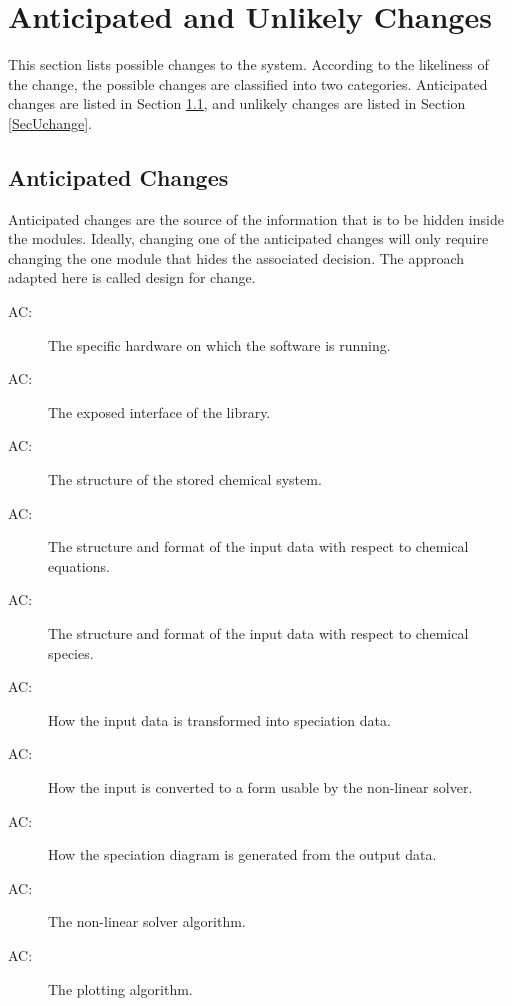 \documentclass[12pt, titlepage]{article}
\newcounter{acnum}
\newcommand{\actheacnum}{AC\theacnum}
\begin{document}
\section{Anticipated and Unlikely Changes} \label{SecChange}

This section lists possible changes to the system. According to the likeliness
of the change, the possible changes are classified into two
categories. Anticipated changes are listed in Section \ref{SecAchange}, and
unlikely changes are listed in Section \ref{SecUchange}.

\subsection{Anticipated Changes} \label{SecAchange}

Anticipated changes are the source of the information that is to be hidden
inside the modules. Ideally, changing one of the anticipated changes will only
require changing the one module that hides the associated decision. The approach
adapted here is called design for
change.

\begin{description}
\item[ \actheacnum \label{acHardware}:] The specific
  hardware on which the software is running.
\item[ \actheacnum \label{acEI}:] The exposed interface 
  of the library.  
\item[ \actheacnum \label{acI}:] The structure of the stored
  chemical system.
\item[ \actheacnum \label{acIE}:] The structure and format of the
  input data with respect to chemical equations.  
\item[ \actheacnum \label{acIS}:] The structure and format of the
  input data with respect to chemical species.
\item[ \actheacnum \label{acC}:] How the input data is 
  transformed into speciation data.
\item[ \actheacnum \label{acIC}:] How the input is converted
  to a form usable by the non-linear solver.
\item[ \actheacnum \label{acDG}:] How the speciation diagram
  is generated from the output data.
\item[ \actheacnum \label{acNLS}:] The non-linear solver
  algorithm.
\item[ \actheacnum \label{acP}:] The plotting algorithm.
\end{description}
\end{document}
